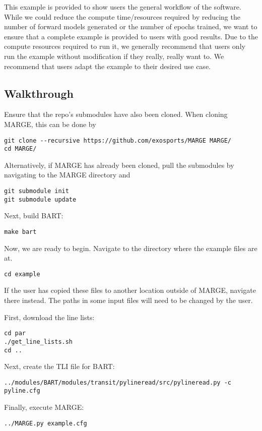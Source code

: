 \documentclass[letterpaper, 12pt]{article}
\begin{document}
\noindent This example is provided to show users the general workflow of the 
software.  While we could reduce the compute time/resources required by 
reducing the number of forward models generated or the number of epochs 
trained, we want to ensure that a complete example is provided to users 
with good results.  Due to the compute resources required to run it, we 
generally recommend that users only run the example without modification 
if they really, really want to.  We recommend that users adapt the example 
to their desired use case. 


\subsection{Walkthrough}

Ensure that the repo's submodules have also been cloned.  
When cloning MARGE, this can be done by
\begin{verbatim}
git clone --recursive https://github.com/exosports/MARGE MARGE/
cd MARGE/
\end{verbatim}
Alternatively, if MARGE has already been cloned, pull the submodules by 
navigating to the MARGE directory and 
\begin{verbatim}
git submodule init
git submodule update
\end{verbatim}

\noindent Next, build BART:
\begin{verbatim}
make bart
\end{verbatim}

\noindent Now, we are ready to begin.
Navigate to the directory where the example files are at.
\begin{verbatim}
cd example
\end{verbatim}
If the user has copied these files to another location outside of MARGE, 
navigate there instead.  The paths in some input files will need to be changed 
by the user. \newline

\noindent First, download the line lists:
\begin{verbatim}
cd par
./get_line_lists.sh
cd ..
\end{verbatim}

\noindent Next, create the TLI file for BART:
\begin{verbatim}
../modules/BART/modules/transit/pylineread/src/pylineread.py -c pyline.cfg
\end{verbatim}

\noindent Finally, execute MARGE:
\begin{verbatim}
../MARGE.py example.cfg
\end{verbatim}
\end{document}
